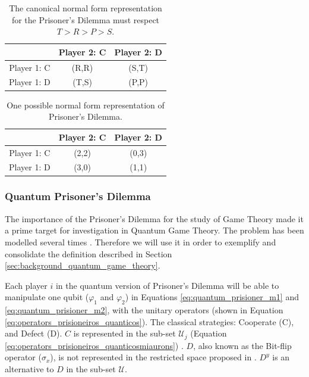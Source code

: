 \begin{center}
\begin{table}[h]
\begin{centering}
\begin{tabular}{ccc}
\hline 
 & Player 2: C & Player 2: D\tabularnewline
\hline 
Player 1: C & (R,R) & (S,T)\tabularnewline
Player 1: D & (T,S) & (P,P)\tabularnewline
\hline 
\end{tabular}
\par\end{centering}

\caption{The canonical normal form representation for the Prisoner's Dilemma must respect $T>R>P>S$.}
\label{tab:prisionersdillema_tab1}
\end{table}
\par\end{center}

\begin{center}
\begin{table}[h]
\begin{centering}
\begin{tabular}{ccc}
\hline 
 & Player 2: C & Player 2: D\tabularnewline
\hline 
Player 1: C & (2,2) & (0,3)\tabularnewline
Player 1: D & (3,0) & (1,1)\tabularnewline
\hline 
\end{tabular}
\par\end{centering}

\caption{One possible normal form representation of Prisoner's Dilemma.}
\label{tab:prisionersdillema_tab2}
\end{table}
\par\end{center}


\subsubsection{Quantum Prisoner's Dilemma}
\label{subsubsec:quantum_prisioners_dillema}

The importance of the Prisoner's Dilemma for the study of Game Theory made it a prime target for investigation in Quantum Game Theory. The problem has been modelled several times \cite{Eisert2008}\cite{Letters2002}. Therefore we will use it in order to exemplify and consolidate the definition described in Section \ref{sec:background_quantum_game_theory}\cite{Fra2011a}. 

Each player $i$ in the quantum version of Prisoner's Dilemma will be able to manipulate one qubit ($\varphi_{1}$ and $\varphi_{2}$) in Equations \ref{eq:quantum_prisioner_m1} and \ref{eq:quantum_prisioner_m2}, with the unitary operators (shown in Equation \ref{eq:operators_prisioneiros_quanticos}). The  classical strategies: Cooperate (C), and Defect (D). $C$ is represented in the sub-set $\mathcal{U}_{j}$ (Equation \ref{eq:operators_prisioneiros_quanticosmiaurons}) . $D$, also known as the Bit-flip operator ($\sigma_{x}$), is not represented in the restricted space proposed in \cite{Eisert2008}\cite{Fra2011a}. $D^{y}$ is an alternative to $D$ in the sub-set $\mathcal{U}$.

